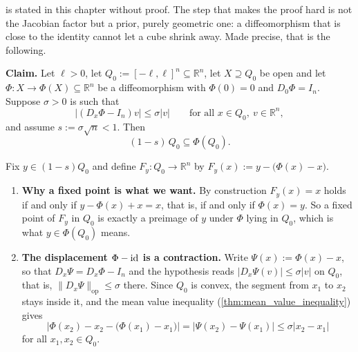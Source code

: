 \begin{example}
\label{ex:cube_covering_lemma_substitution}
 is stated in this chapter without proof. The step that makes the
proof hard is not the Jacobian factor but a prior, purely geometric one: a diffeomorphism that is
close to the identity cannot let a cube shrink away. Made precise, that is the following.

\textbf{Claim.} Let $\ell > 0$, let $Q_0 := [-\ell,\ell]^n \subseteq \mathbb{R}^n$, let
$X \supseteq Q_0$ be open and let $\Phi : X \to \Phi(X) \subseteq \mathbb{R}^n$ be a
diffeomorphism with $\Phi(0) = 0$ and $D_0\Phi = I_n$. Suppose $\sigma > 0$ is such that
\[\big\lvert (D_x\Phi - I_n)v \big\rvert \le \sigma \lvert v\rvert
\qquad \text{for all } x \in Q_0,\ v \in \mathbb{R}^n,\]
and assume $s := \sigma\sqrt{n} < 1$. Then
\[(1-s)\,Q_0 \subseteq \Phi(Q_0).\]

Fix $y \in (1-s)Q_0$ and define $F_y : Q_0 \to \mathbb{R}^n$ by
$F_y(x) := y - \big(\Phi(x) - x\big)$.

\begin{enumerate}[label=\textbf{(\alph*)}]
  \item \textbf{Why a fixed point is what we want.} By construction $F_y(x) = x$ holds if and only
    if $y - \Phi(x) + x = x$, that is, if and only if $\Phi(x) = y$. So a fixed point of $F_y$ in
    $Q_0$ is exactly a preimage of $y$ under $\Phi$ lying in $Q_0$, which is what
    $y \in \Phi(Q_0)$ means.

  \item \textbf{The displacement $\Phi - \operatorname{id}$ is a contraction.} Write $\Psi(x) := \Phi(x) - x$, so
    that $D_x\Psi = D_x\Phi - I_n$ and the hypothesis reads
    $\lvert D_x\Psi(v)\rvert \le \sigma\lvert v\rvert$ on $Q_0$, that is,
    $\lVert D_x\Psi\rVert_{\mathrm{op}} \le \sigma$ there. Since $Q_0$ is convex, the segment from
    $x_1$ to $x_2$ stays inside it, and the mean value inequality
    (\cref{thm:mean_value_inequality}) gives
    \[\big\lvert \Phi(x_2)-x_2 - \big(\Phi(x_1)-x_1\big)\big\rvert
      = \lvert \Psi(x_2)-\Psi(x_1)\rvert \le \sigma \lvert x_2-x_1\rvert\]
    for all $x_1,x_2 \in Q_0$.


\end{enumerate}
\end{example}
